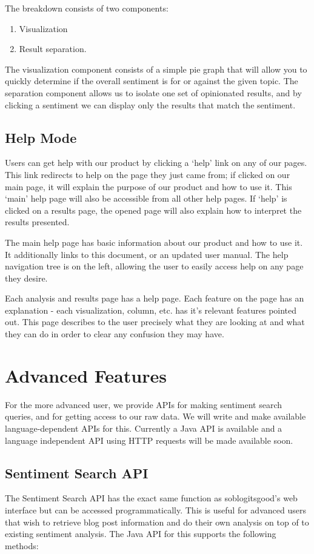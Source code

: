 \documentclass[titlepage]{article}
\begin{document}
The breakdown consists of two components:
\begin{enumerate}
\item Visualization
\item Result separation.
\end{enumerate}

The visualization component consists of a simple pie graph that will allow you
to quickly determine if the overall sentiment is for or against the given
topic.  The separation component allows us to isolate one set of opinionated
results, and by clicking a sentiment we can display only the results that
match the sentiment.


\subsection{Help Mode}
Users can get help with our product by clicking a `help' link on any of our
pages.  This link redirects to help on the page they just came from; if
clicked on our main page, it will explain the purpose of our product and how
to use it.  This `main' help page will also be accessible from all other help
pages.  If `help' is clicked on a results page, the opened page will also
explain how to interpret the results presented.

The main help page has basic information about our product and how to
use it.  It additionally links to this document, or an updated user
manual.  The help navigation tree is on the left, allowing the user to
easily access help on any page they desire.

Each analysis and results page has a help page.  Each feature on the
page has an explanation - each visualization, column, etc. has it's
relevant features pointed out.  This page describes to the user
precisely what they are looking at and what they can do in order to
clear any confusion they may have.

\section{Advanced Features}
For the more advanced user, we provide APIs for making sentiment search
queries, and for getting access to our raw data.  We will write and make
available language-dependent APIs for this.  Currently a Java API is available
and a language independent API using HTTP requests will be made available
soon.


\subsection{Sentiment Search API}
The Sentiment Search API has the exact same function as \textsf{soblogitsgood}'s web
interface but can be accessed programmatically.  This is useful for advanced
users that wish to retrieve blog post information and do their own analysis on
top of to existing sentiment analysis.  The Java API for this supports the
following methods:
\end{document}
